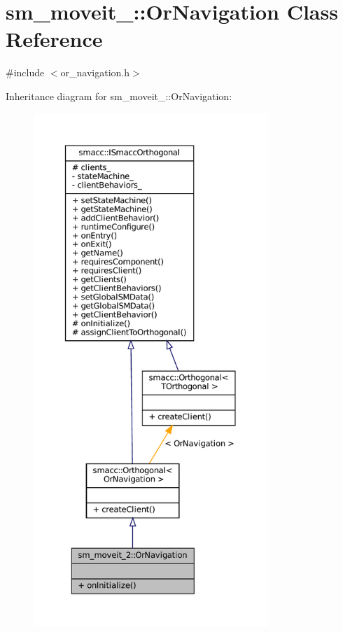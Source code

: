 \hypertarget{classsm__moveit__2_1_1OrNavigation}{}\section{sm\+\_\+moveit\+\_\+:\+:Or\+Navigation Class Reference}
\label{classsm__moveit__2_1_1OrNavigation}


{\ttfamily \#include $<$or\+\_\+navigation.\+h$>$}



Inheritance diagram for sm\+\_\+moveit\+\_\+:\+:Or\+Navigation\+:
\nopagebreak
\begin{figure}[H]
\begin{center}
\leavevmode
\includegraphics[height=550pt]{classsm__moveit__2_1_1OrNavigation__inherit__graph}
\end{center}
\end{figure}



